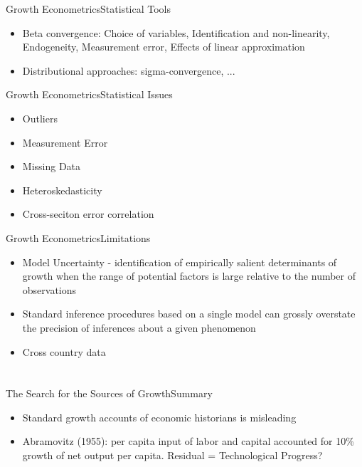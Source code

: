 \documentclass{beamer}
\begin{document}
\begin{frame}{Growth Econometrics}{Statistical Tools}
\begin{itemize}
\item{Beta convergence: Choice of variables, Identification and non-linearity, Endogeneity, Measurement error, Effects of linear approximation}
\item{Distributional approaches: sigma-convergence, ...}
\end{itemize}
\end{frame}

\begin{frame}{Growth Econometrics}{Statistical Issues}
\begin{itemize}
\item{Outliers}
\item{Measurement Error}
\item{Missing Data}
\item{Heteroskedasticity}
\item{Cross-seciton error correlation}

\end{itemize}
\end{frame}

\begin{frame}{Growth Econometrics}{Limitations}
\begin{itemize}
\item{Model Uncertainty - identification of empirically salient determinants of growth when the range
of potential factors is large relative to the number of observations}
\item{Standard inference procedures based on a single model can grossly overstate the precision of inferences about a given phenomenon}
\item{Cross country data}
\end{itemize}
\end{frame}

\section{\cite{Abramovitz1993}}
\begin{frame}{The Search for the Sources of Growth}{Summary}
\begin{itemize}
\item{Standard growth accounts of economic historians is misleading}
\item{Abramovitz (1955): per capita input of labor and capital accounted for 10\% growth of net output per capita. Residual = Technological Progress?}
\end{itemize}
\end{frame}
\end{document}
